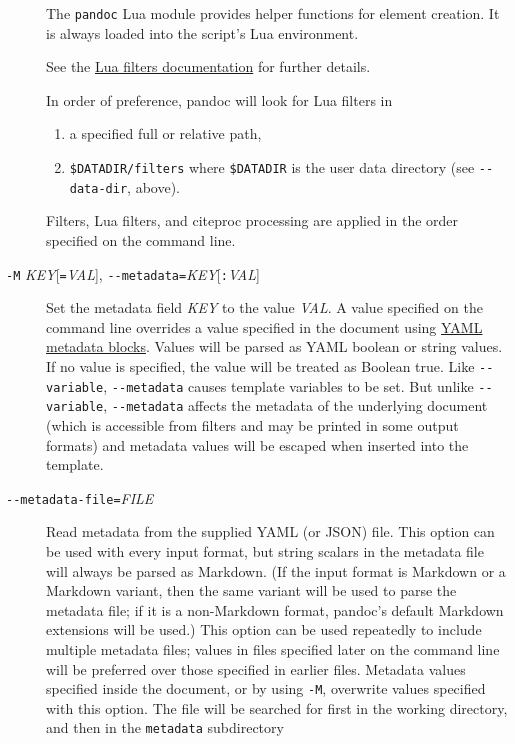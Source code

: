 \documentclass[
  a4paper,
]{article}
\begin{document}
\begin{description}
The \texttt{pandoc} Lua module provides helper functions for element
creation. It is always loaded into the script's Lua environment.

See the \href{https://pandoc.org/lua-filters.html}{Lua filters
documentation} for further details.

In order of preference, pandoc will look for Lua filters in

\begin{enumerate}
\def\labelenumi{\arabic{enumi}.}
\item
  a specified full or relative path,
\item
  \texttt{\$DATADIR/filters} where \texttt{\$DATADIR} is the user data
  directory (see \texttt{-\/-data-dir}, above).
\end{enumerate}

Filters, Lua filters, and citeproc processing are applied in the order
specified on the command line.
\item[\texttt{-M} \emph{KEY}{[}\texttt{=}\emph{VAL}{]},
\texttt{-\/-metadata=}\emph{KEY}{[}\texttt{:}\emph{VAL}{]}]
Set the metadata field \emph{KEY} to the value \emph{VAL}. A value
specified on the command line overrides a value specified in the
document using \protect\hyperlink{extension-yaml_metadata_block}{YAML
metadata blocks}. Values will be parsed as YAML boolean or string
values. If no value is specified, the value will be treated as Boolean
true. Like \texttt{-\/-variable}, \texttt{-\/-metadata} causes template
variables to be set. But unlike \texttt{-\/-variable},
\texttt{-\/-metadata} affects the metadata of the underlying document
(which is accessible from filters and may be printed in some output
formats) and metadata values will be escaped when inserted into the
template.
\item[\texttt{-\/-metadata-file=}\emph{FILE}]
Read metadata from the supplied YAML (or JSON) file. This option can be
used with every input format, but string scalars in the metadata file
will always be parsed as Markdown. (If the input format is Markdown or a
Markdown variant, then the same variant will be used to parse the
metadata file; if it is a non-Markdown format, pandoc's default Markdown
extensions will be used.) This option can be used repeatedly to include
multiple metadata files; values in files specified later on the command
line will be preferred over those specified in earlier files. Metadata
values specified inside the document, or by using \texttt{-M}, overwrite
values specified with this option. The file will be searched for first
in the working directory, and then in the \texttt{metadata} subdirectory

\end{description}
\end{document}
